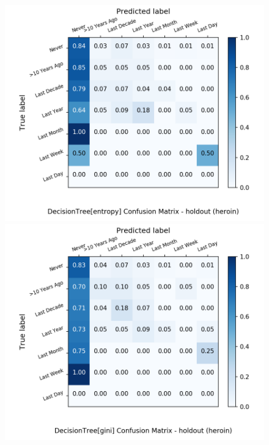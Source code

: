 \begin{figure}[H]
	\centering
	\begin{minipage}[b]{0.32\textwidth}
		\includegraphics[width=1.1\textwidth]{Plots/drugs/heroin_DecisionTree_entropy_balance_False_holdout.png}
	\end{minipage}
	\begin{minipage}[b]{0.32\textwidth}
		\includegraphics[width=1.1\textwidth]{Plots/drugs/heroin_DecisionTree_gini_balance_False_holdout.png}
	\end{minipage}

\end{figure}
